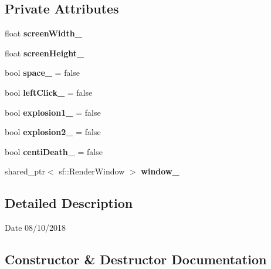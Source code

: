 \subsection*{Private Attributes}
\begin{DoxyCompactItemize}
\item 
\mbox{\label{class_display_a4947394667563143d700dafbdd0efe66}} 
float {\bfseries screen\+Width\+\_\+}
\item 
\mbox{\label{class_display_a5f8665b38c1e1a97f9dd81b6cd1ac2e8}} 
float {\bfseries screen\+Height\+\_\+}
\item 
\mbox{\label{class_display_ad779eb92e98ca808927911643fa204e0}} 
bool {\bfseries space\+\_\+} = false
\item 
\mbox{\label{class_display_a6ae5ccee0b26e0e931a70e7e6f81714b}} 
bool {\bfseries left\+Click\+\_\+} = false
\item 
\mbox{\label{class_display_a9e1fdef4cf2bcac717ef7bc7980903f6}} 
bool {\bfseries explosion1\+\_\+} = false
\item 
\mbox{\label{class_display_a068681e5d3dd92d054292035dd11b064}} 
bool {\bfseries explosion2\+\_\+} = false
\item 
\mbox{\label{class_display_ae437f98aef102dbfa4c5c1c663c44de5}} 
bool {\bfseries centi\+Death\+\_\+} = false
\item 
\mbox{\label{class_display_a6ce64beac32a0fa76365a63692e8ef97}} 
shared\+\_\+ptr$<$ sf\+::\+Render\+Window $>$ {\bfseries window\+\_\+}
\end{DoxyCompactItemize}


\subsection{Detailed Description}
\begin{DoxyDate}{Date}
08/10/2018 
\end{DoxyDate}


\subsection{Constructor \& Destructor Documentation}
\mbox{\label{class_display_ac2607a6bb236c55547a4223d40d85d1f}} 

